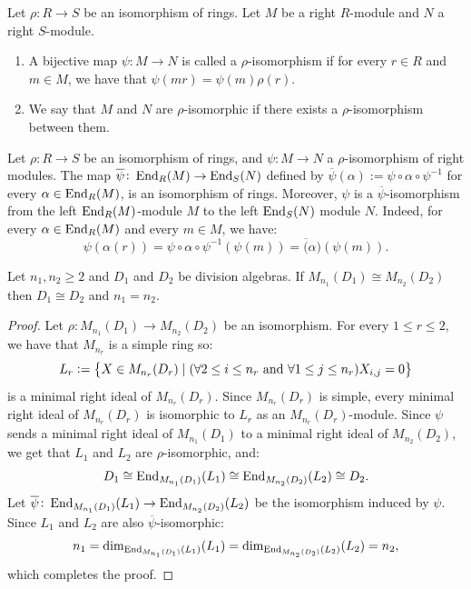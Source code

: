 \documentclass[11pt,a4paper]{article}
\begin{document}
\begin{definition}
  Let $\rho \colon R \to S$ be an isomorphism of rings.
  Let $M$ be a right $R$-module and $N$ a right $S$-module.
  \begin{enumerate}
    \item[(1)] A bijective map $\psi \colon M \to N$ is called a
      $\rho$-isomorphism if for every $r \in R$ and $m \in M$,
      we have that $\psi(mr) = \psi(m) \rho(r)$.
    \item[(2)] We say that $M$ and $N$ are $\rho$-isomorphic if there exists
      a $\rho$-isomorphism between them.
  \end{enumerate}
\end{definition}

\begin{remark}
  Let $\rho \colon R \to S$ be an isomorphism of rings,
  and $\psi \colon M \to N$ a $\rho$-isomorphism of right modules.
  The map $\overline \psi \colon \operatorname{End}_R(M) \to \operatorname{End}_S(N)$ defined by
  $\overline \psi(\alpha) := \psi \circ \alpha \circ \psi^{-1}$
  for every $\alpha \in \operatorname{End}_R(M)$,
  is an isomorphism of rings.
  Moreover, $\psi$ is a $\overline \psi$-isomorphism from the left
  $\operatorname{End}_R(M)$-module $M$ to the left $\operatorname{End}_S(N)$ module $N$.
  Indeed, for every $\alpha \in \operatorname{End}_R(M)$ and every $m \in M$,
  we have:
  \[
    \psi(\alpha(r)) =
    \psi \circ \alpha \circ \psi^{-1}(\psi(m)) =
    \overline(\alpha)(\psi(m)).
  \]
\end{remark}

\begin{lemma}
  \label{lem:matrices-over-division-rings-are-unique}
  Let $n_1,n_2 \geq 2$ and $D_1$ and $D_2$ be division algebras.
  If $M_{n_1}(D_1) \cong M_{n_2}(D_2)$ then $D_1 \cong D_2$
  and $n_1 = n_2$.
\end{lemma}
\begin{proof}
  Let $\rho \colon M_{n_1}(D_1) \to M_{n_2}(D_2)$ be an isomorphism.
  For every $1 \le r \le 2$, we have that $M_{n_r}$ is a simple ring %
  so:
  \[
    L_r := \left\{X \in M_{n_r}(D_r) \mid (\forall 2 \le i \le n_r \text{ and }
    \forall 1 \le j \le n_r) X_{i,j} = 0\right\}
  \]
  is a minimal right ideal of $M_{n_r}(D_r)$.
  Since $M_{n_r}(D_r)$ is simple,
  every minimal right ideal of $M_{n_r}(D_r)$ is isomorphic to $L_r$
  as an $M_{n_r}(D_r)$-module.
  Since $\psi$ sends a minimal right ideal of $M_{n_1}(D_1)$
  to a minimal right ideal of $M_{n_2}(D_2)$,
  we get that $L_1$ and $L_2$ are $\rho$-isomorphic,
  and:
  \[
    D_1 \cong
    \operatorname{End}_{M_{n_1}(D_1)}(L_1) \cong
    \operatorname{End}_{M_{n_2}(D_2)}(L_2) \cong
    D_2.
  \]
  Let
  $\overline \psi \colon \operatorname{End}_{M_{n_1}(D_1)}(L_1) \to \operatorname{End}_{M_{n_2}(D_2)}(L_2)$
  be the isomorphism induced by $\psi$.
  Since $L_1$ and $L_2$ are also $\overline \psi$-isomorphic:
  \[
    n_1 =
    \dim_{\operatorname{End}_{M_{n_1}(D_1)}(L_1)}(L_1) =
    \dim_{\operatorname{End}_{M_{n_2}(D_2)}(L_2)}(L_2) =
    n_2,
  \]
  which completes the proof.
\end{proof}
\end{document}
